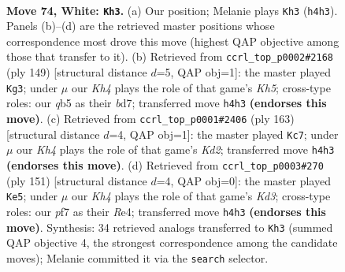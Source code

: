 \documentclass[11pt]{article}
\begin{document}
\clearpage

\begin{figure}[p]\centering
\begin{subfigure}{0.46\textwidth}\centering
\resizebox{\linewidth}{!}{%
\newchessgame
\chessboard[
  setfen={8/2k2pb1/8/1q6/7K/8/8/8 w - - 2 74},
  showmover=false,
  pgfstyle=straightmove, color=movearrow, markmove={h4-h3}
]}
\caption{}
\end{subfigure}\hfill
\begin{subfigure}{0.46\textwidth}\centering
\resizebox{\linewidth}{!}{%
\newchessgame
\chessboard[
  setfen={8/3B4/8/8/1p5k/1P6/8/2b3K1 b - - 13 75},
  showmover=false,
  pgfstyle=straightmove, color=movearrow, markmove={h4-g3}
]}
\caption{}
\end{subfigure}
\\[4pt]
\begin{subfigure}{0.46\textwidth}\centering
\resizebox{\linewidth}{!}{%
\newchessgame
\chessboard[
  setfen={7Q/3k4/p5K1/8/8/8/8/8 b - - 0 82},
  showmover=false,
  pgfstyle=straightmove, color=movearrow, markmove={d7-c7}
]}
\caption{}
\end{subfigure}\hfill
\begin{subfigure}{0.46\textwidth}\centering
\resizebox{\linewidth}{!}{%
\newchessgame
\chessboard[
  setfen={8/8/3k2K1/8/4r3/1Q6/8/8 b - - 10 76},
  showmover=false,
  pgfstyle=straightmove, color=movearrow, markmove={d6-e5}
]}
\caption{}
\end{subfigure}
\caption{\textbf{Move 74, White: \texttt{Kh3}.} (a) Our position; Melanie plays \texttt{Kh3} (\texttt{h4h3}). Panels (b)--(d) are the retrieved master positions whose correspondence most drove this move (highest QAP objective among those that transfer to it). (b) Retrieved from \texttt{ccrl\_top\_p0002\#2168} (ply 149) [structural distance $d$=5, QAP obj=1]: the master played \texttt{Kg3}; under $\mu$ our \emph{Kh4} plays the role of that game's \emph{Kh5}; cross-type roles: our \emph{q}b5 as their \emph{b}d7; transferred move \texttt{h4h3} \textbf{(endorses this move)}. (c) Retrieved from \texttt{ccrl\_top\_p0001\#2406} (ply 163) [structural distance $d$=4, QAP obj=1]: the master played \texttt{Kc7}; under $\mu$ our \emph{Kh4} plays the role of that game's \emph{Kd2}; transferred move \texttt{h4h3} \textbf{(endorses this move)}. (d) Retrieved from \texttt{ccrl\_top\_p0003\#270} (ply 151) [structural distance $d$=4, QAP obj=0]: the master played \texttt{Ke5}; under $\mu$ our \emph{Kh4} plays the role of that game's \emph{Kd3}; cross-type roles: our \emph{p}f7 as their \emph{R}e4; transferred move \texttt{h4h3} \textbf{(endorses this move)}. Synthesis: 34 retrieved analogs transferred to \texttt{Kh3} (summed QAP objective 4, the strongest correspondence among the candidate moves); Melanie committed it via the \texttt{search} selector.}
\label{fig:thought-m146}
\end{figure}
\end{document}
